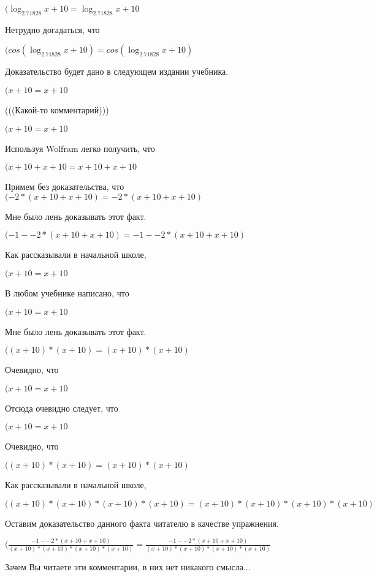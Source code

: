 \documentclass[12pt,a4paper,fleqn]{article}
\theoremstyle{definition}
\begin{document}
$(\log_{ 2.71828 }{ x  +  10 } = \log_{ 2.71828 }{ x  +  10 }$

Нетрудно догадаться, что

$(cos(\log_{ 2.71828 }{ x  +  10 }) = cos(\log_{ 2.71828 }{ x  +  10 })$

Доказательство будет дано в следующем издании учебника.

$( x  +  10  =  x  +  10 $

(((Какой-то комментарий)))

$( x  +  10  =  x  +  10 $

Используя Wolfram легко получить, что

$( x  +  10  +  x  +  10  =  x  +  10  +  x  +  10 $

Примем без доказательства, что
$( -2  * ( x  +  10  +  x  +  10 ) =  -2  * ( x  +  10  +  x  +  10 )$

Мне было лень доказывать этот факт.

$( -1  -  -2  * ( x  +  10  +  x  +  10 ) =  -1  -  -2  * ( x  +  10  +  x  +  10 )$

Как рассказывали в начальной школе,

$( x  +  10  =  x  +  10 $

В любом учебнике написано, что

$( x  +  10  =  x  +  10 $

Мне было лень доказывать этот факт.

$(( x  +  10 ) * ( x  +  10 ) = ( x  +  10 ) * ( x  +  10 )$

Очевидно, что

$( x  +  10  =  x  +  10 $

Отсюда очевидно следует, что

$( x  +  10  =  x  +  10 $

Очевидно, что

$(( x  +  10 ) * ( x  +  10 ) = ( x  +  10 ) * ( x  +  10 )$

Как рассказывали в начальной школе,

$(( x  +  10 ) * ( x  +  10 ) * ( x  +  10 ) * ( x  +  10 ) = ( x  +  10 ) * ( x  +  10 ) * ( x  +  10 ) * ( x  +  10 )$

Оставим доказательство данного факта читателю в качестве упражнения.

$(\frac{ -1  -  -2  * ( x  +  10  +  x  +  10 )}{( x  +  10 ) * ( x  +  10 ) * ( x  +  10 ) * ( x  +  10 )}
 = \frac{ -1  -  -2  * ( x  +  10  +  x  +  10 )}{( x  +  10 ) * ( x  +  10 ) * ( x  +  10 ) * ( x  +  10 )}
$

Зачем Вы читаете эти комментарии, в них нет никакого смысла...
\end{document}
